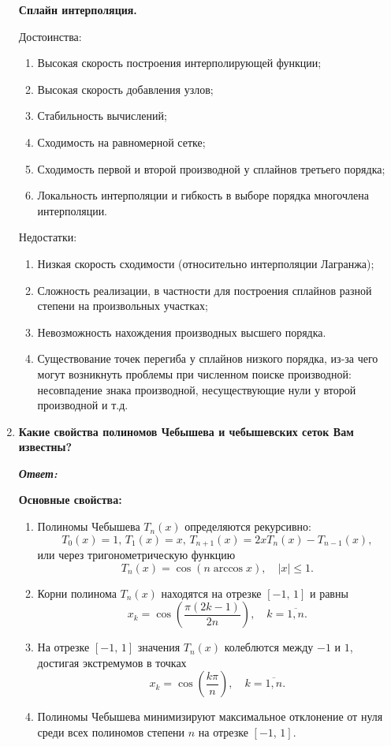 \documentclass[12pt, a4paper]{article}
\newcommand{\abs}[1]{\lvert #1 \rvert}
\begin{document}
\begin{enumerate}
	\textbf{Сплайн интерполяция.}
	
	Достоинства:
	\begin{enumerate}
		\item Высокая скорость построения интерполирующей функции;
		\item Высокая скорость добавления узлов;
		\item Стабильность вычислений;
		\item Сходимость на равномерной сетке;
		\item Сходимость первой и второй производной у сплайнов третьего порядка;
		\item Локальность интерполяции и гибкость в выборе порядка многочлена интерполяции.
	\end{enumerate}
	
	Недостатки:
	\begin{enumerate}
		\item Низкая скорость сходимости (относительно интерполяции Лагранжа);
		\item Сложность реализации, в частности для построения сплайнов разной степени на произвольных участках;
		\item Невозможность нахождения производных высшего порядка.
		\item Существование точек перегиба у сплайнов низкого порядка, из-за чего могут возникнуть проблемы при численном поиске производной: несовпадение знака производной, несуществующие нули у второй производной и т.д.
	\end{enumerate}
	
	\item \textbf{Какие свойства полиномов Чебышева и чебышевских сеток Вам известны?}
	\vspace*{0.2cm}
	
	\textit{\textbf{Ответ:}}

	\textbf{Основные свойства:}
	\begin{enumerate}
		\item Полиномы Чебышева $T_n(x)$ определяются рекурсивно:
		\[
		T_0(x) = 1, \, T_1(x) = x, \, T_{n+ 1}(x) = 2x T_n(x) - T_{n - 1}(x),
		\]
		или через тригонометрическую функцию
		\[
		T_n(x) = \cos (n \arccos x), \quad \abs{x} \le 1.
		\]
		\item Корни полинома $T_n(x)$ находятся на отрезке $[-1,\,1]$	и равны
		\[
		x_k = \cos \left(\frac{\pi (2k - 1)}{2n}\right), \quad k = \overline{1,n}.
		\]
		\item На отрезке $[-1, \, 1]$ значения $T_n(x)$ колеблются между $-1$ и $1$, достигая экстремумов в точках
		\[
		x_k = \cos \left( \frac{k \pi}{n}\right), \quad k = \overline{1,n}.
		\]
		\item Полиномы Чебышева минимизируют максимальное отклонение от нуля среди всех полиномов степени $n$ на отрезке $[-1, \, 1]$.
	\end{enumerate}
	\end{enumerate}
	



	
\end{document}
